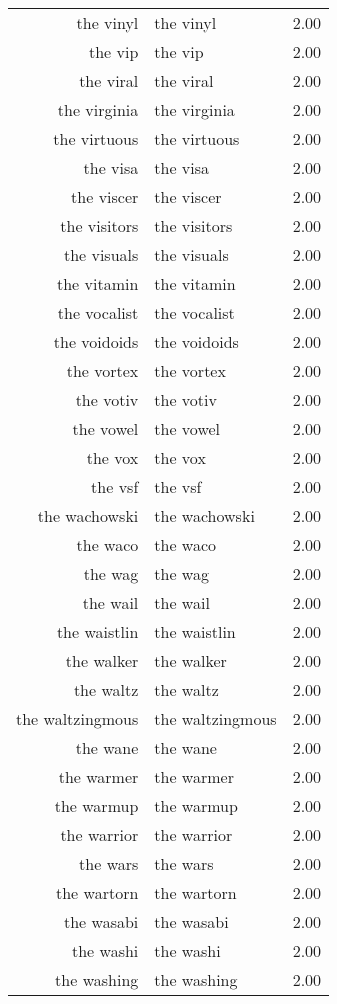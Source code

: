 \begin{table}[ht]
\begin{tabular}{rlr}
  the vinyl & the vinyl & 2.00 \\ 
  the vip & the vip & 2.00 \\ 
  the viral & the viral & 2.00 \\ 
  the virginia & the virginia & 2.00 \\ 
  the virtuous & the virtuous & 2.00 \\ 
  the visa & the visa & 2.00 \\ 
  the viscer & the viscer & 2.00 \\ 
  the visitors & the visitors & 2.00 \\ 
  the visuals & the visuals & 2.00 \\ 
  the vitamin & the vitamin & 2.00 \\ 
  the vocalist & the vocalist & 2.00 \\ 
  the voidoids & the voidoids & 2.00 \\ 
  the vortex & the vortex & 2.00 \\ 
  the votiv & the votiv & 2.00 \\ 
  the vowel & the vowel & 2.00 \\ 
  the vox & the vox & 2.00 \\ 
  the vsf & the vsf & 2.00 \\ 
  the wachowski & the wachowski & 2.00 \\ 
  the waco & the waco & 2.00 \\ 
  the wag & the wag & 2.00 \\ 
  the wail & the wail & 2.00 \\ 
  the waistlin & the waistlin & 2.00 \\ 
  the walker & the walker & 2.00 \\ 
  the waltz & the waltz & 2.00 \\ 
  the waltzingmous & the waltzingmous & 2.00 \\ 
  the wane & the wane & 2.00 \\ 
  the warmer & the warmer & 2.00 \\ 
  the warmup & the warmup & 2.00 \\ 
  the warrior & the warrior & 2.00 \\ 
  the wars & the wars & 2.00 \\ 
  the wartorn & the wartorn & 2.00 \\ 
  the wasabi & the wasabi & 2.00 \\ 
  the washi & the washi & 2.00 \\ 
  the washing & the washing & 2.00 \\ 

\end{tabular}
\end{table}
